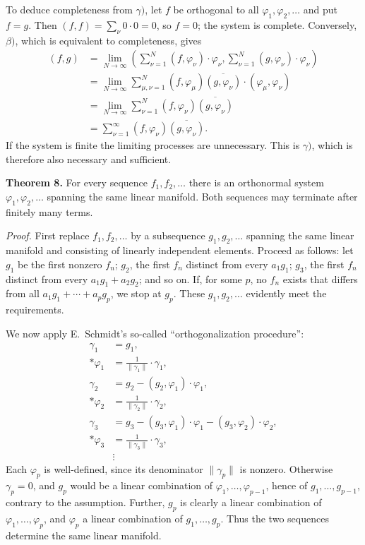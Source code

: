\documentclass[fontsize=13pt,twoside,openany,headings=normal,parskip=false,bookmarkpackage=false,DIV=calc]{scrbook}
\begin{document}
To deduce completeness from $\gamma)$, let $f$ be orthogonal to all $\varphi_1,\varphi_2,\ldots$ and put $f=g$. Then $(f,f)=\sum_\nu0\cdot0=0$, so $f=0$; the system is complete.
\hypertarget{origpage-29}{}%
Conversely, $\beta)$, which is equivalent to completeness, gives
\begin{align*}
(f,g)&=\lim_{N\to\infty}
\left(\sum_{\nu=1}^N(f,\varphi_\nu)\cdot\varphi_\nu,
\sum_{\nu=1}^N(g,\varphi_\nu)\cdot\varphi_\nu\right)\\
&=\lim_{N\to\infty}\sum_{\mu,\nu=1}^N
(f,\varphi_\mu)\overline{(g,\varphi_\nu)}\cdot(\varphi_\mu,\varphi_\nu)\\
&=\lim_{N\to\infty}\sum_{\nu=1}^N
(f,\varphi_\nu)\overline{(g,\varphi_\nu)}\\
&=\sum_{\nu=1}^\infty(f,\varphi_\nu)\overline{(g,\varphi_\nu)}.
\end{align*}
If the system is finite the limiting processes are unnecessary. This is $\gamma)$, which is therefore also necessary and sufficient.

\leavevmode{}\textbf{Theorem 8.}\label{thm:II.8} For every sequence $f_1,f_2,\ldots$ there is an orthonormal system $\varphi_1,\varphi_2,\ldots$ spanning the same linear manifold. Both sequences may terminate after finitely many terms.

\emph{Proof.} First replace $f_1,f_2,\ldots$ by a subsequence $g_1,g_2,\ldots$ spanning the same linear manifold and consisting of linearly independent elements. Proceed as follows: let $g_1$ be the first nonzero $f_n$; $g_2$, the first $f_n$ distinct from every $a_1g_1$; $g_3$, the first $f_n$ distinct from every $a_1g_1+a_2g_2$; and so on. If, for some $p$, no $f_n$ exists that differs from all $a_1g_1+\cdots+a_pg_p$, we stop at $g_p$. These $g_1,g_2,\ldots$ evidently meet the requirements.

We now apply E.~Schmidt's so-called ``orthogonalization procedure'':
\begin{align*}
\gamma_1&=g_1,\\*
\varphi_1&=\frac1{\|\gamma_1\|}\cdot\gamma_1,\\
\gamma_2&=g_2-(g_2,\varphi_1)\cdot\varphi_1,\\*
\varphi_2&=\frac1{\|\gamma_2\|}\cdot\gamma_2,\\
\gamma_3&=g_3-(g_3,\varphi_1)\cdot\varphi_1-(g_3,\varphi_2)\cdot\varphi_2,\\*
\varphi_3&=\frac1{\|\gamma_3\|}\cdot\gamma_3,\\
&\vdots
\end{align*}
Each $\varphi_p$ is well-defined, since its denominator $\|\gamma_p\|$ is nonzero. Otherwise $\gamma_p=0$, and $g_p$ would be a linear combination of $\varphi_1,\ldots,\varphi_{p-1}$, hence of $g_1,\ldots,g_{p-1}$, contrary to the assumption. Further, $g_p$ is clearly a linear combination of $\varphi_1,\ldots,\varphi_p$, and $\varphi_p$ a linear combination of $g_1,\ldots,g_p$. Thus the two sequences determine the same linear manifold.
\end{document}
